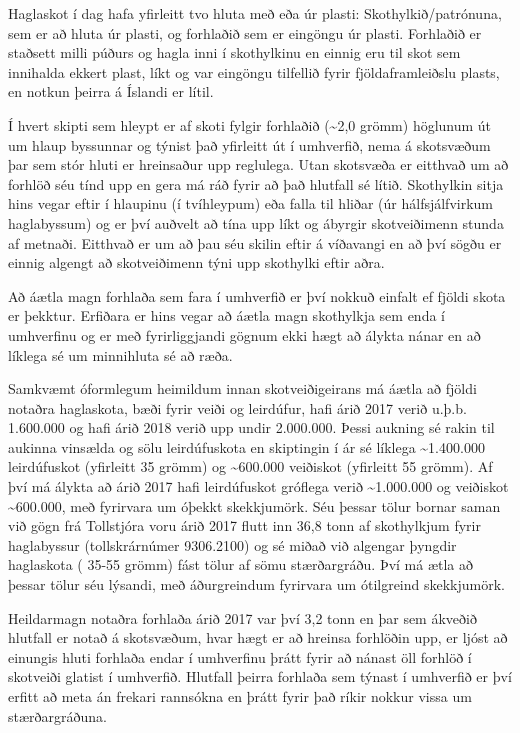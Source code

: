 \documentclass[icelandic,]{book}
\begin{document}
Haglaskot í dag hafa yfirleitt tvo hluta með eða úr plasti: Skothylkið/patrónuna, sem er að hluta úr plasti, og forhlaðið sem er eingöngu úr plasti. Forhlaðið er staðsett milli púðurs og hagla inni í skothylkinu en einnig eru til skot sem innihalda ekkert plast, líkt og var eingöngu tilfellið fyrir fjöldaframleiðslu plasts, en notkun þeirra á Íslandi er lítil.

Í hvert skipti sem hleypt er af skoti fylgir forhlaðið (\textasciitilde{}2,0 grömm) höglunum út um hlaup byssunnar og týnist það yfirleitt út í umhverfið, nema á skotsvæðum þar sem stór hluti er hreinsaður upp reglulega. Utan skotsvæða er eitthvað um að forhlöð séu tínd upp en gera má ráð fyrir að það hlutfall sé lítið. Skothylkin sitja hins vegar eftir í hlaupinu (í tvíhleypum) eða falla til hliðar (úr hálfsjálfvirkum haglabyssum) og er því auðvelt að tína upp líkt og ábyrgir skotveiðimenn stunda af metnaði. Eitthvað er um að þau séu skilin eftir á víðavangi en að því sögðu er einnig algengt að skotveiðimenn týni upp skothylki eftir aðra.

Að áætla magn forhlaða sem fara í umhverfið er því nokkuð einfalt ef fjöldi skota er þekktur. Erfiðara er hins vegar að áætla magn skothylkja sem enda í umhverfinu og er með fyrirliggjandi gögnum ekki hægt að álykta nánar en að líklega sé um minnihluta sé að ræða.

Samkvæmt óformlegum heimildum innan skotveiðigeirans má áætla að fjöldi notaðra haglaskota, bæði fyrir veiði og leirdúfur, hafi árið 2017 verið u.þ.b. 1.600.000 og hafi árið 2018 verið upp undir 2.000.000. Þessi aukning sé rakin til aukinna vinsælda og sölu leirdúfuskota en skiptingin í ár sé líklega \textasciitilde{}1.400.000 leirdúfuskot (yfirleitt 35 grömm) og \textasciitilde{}600.000 veiðiskot (yfirleitt 55 grömm). Af því má álykta að árið 2017 hafi leirdúfuskot gróflega verið \textasciitilde{}1.000.000 og veiðiskot \textasciitilde{}600.000, með fyrirvara um óþekkt skekkjumörk. Séu þessar tölur bornar saman við gögn frá Tollstjóra voru árið 2017 flutt inn 36,8 tonn af skothylkjum fyrir haglabyssur (tollskrárnúmer 9306.2100) og sé miðað við algengar þyngdir haglaskota ( 35-55 grömm) fást tölur af sömu stærðargráðu. Því má ætla að þessar tölur séu lýsandi, með áðurgreindum fyrirvara um ótilgreind skekkjumörk.

Heildarmagn notaðra forhlaða árið 2017 var því 3,2 tonn en þar sem ákveðið hlutfall er notað á skotsvæðum, hvar hægt er að hreinsa forhlöðin upp, er ljóst að einungis hluti forhlaða endar í umhverfinu þrátt fyrir að nánast öll forhlöð í skotveiði glatist í umhverfið. Hlutfall þeirra forhlaða sem týnast í umhverfið er því erfitt að meta án frekari rannsókna en þrátt fyrir það ríkir nokkur vissa um stærðargráðuna.
\end{document}

